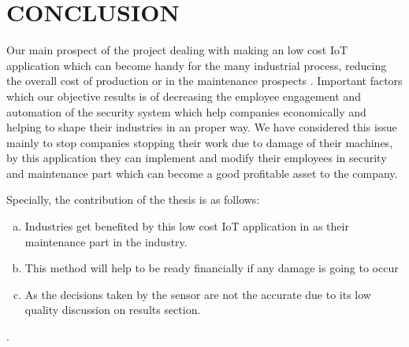 \chapter{CONCLUSION}
Our main prospect of the project dealing with making an low cost IoT application which can become handy for the many industrial process, reducing the overall cost of production or in the maintenance prospects . Important factors which our objective results is of decreasing the employee engagement and automation of the security system which help companies economically and helping to shape their industries in an proper way. We have considered this issue mainly to stop companies stopping their work due to damage of their machines, by this application they can implement and modify their employees in security and maintenance part which can become a good profitable asset to the company.



Specially, the contribution of the thesis is as follows:

\begin{enumerate}[(a)]
\item Industries get benefited by this low cost IoT application in as their maintenance part in the industry.
\item This method will help to be ready financially  if any damage is going to occur 
\item As the decisions taken by the sensor are not the accurate due to its low quality discussion on results section.
\end{enumerate}

.